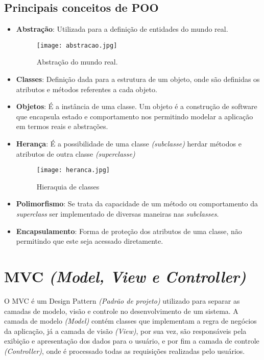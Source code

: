         \subsection{Principais conceitos de POO\label{sub:principais-conceitos}}
            \begin{itemize}
                \item \textbf{Abstração}: Utilizada para a definição de entidades do mundo real.
                        \begin{figure}[!htb]
                            \centering
                            \texttt{[image: abstracao.jpg]}
                            \caption{\small Abstração do mundo real.}
                            \label{cap:conceitos}
                        \end{figure}
                \item \textbf{Classes}: Definição dada para a estrutura de um objeto, onde são definidas os atributos e métodos referentes a cada objeto.
                \item \textbf{Objetos}: É a instância de uma classe. Um objeto é a construção de software que encapsula estado e comportamento nos permitindo modelar a aplicação em termos reais e abstrações.
                \item \textbf{Herança}: É a possibilidade de uma classe \emph{(subclasse)} herdar métodos e atributos de outra classe \emph{(superclasse)}
                        \begin{figure}[!htb]
                            \centering
                            \texttt{[image: heranca.jpg]}
                            \caption{\small Hieraquia de classes}
                            \label{cap:heranca}
                        \end{figure}
                \item \textbf{Polimorfismo}: Se trata da capacidade de um método ou comportamento da \emph{superclass} ser implementado de diversas maneiras nas \emph{subclasses}.
                \item \textbf{Encapsulamento}: Forma de proteção dos atributos de uma classe, não permitindo que este seja acessado diretamente.

            \end{itemize}


    \section{MVC \emph{(Model, View e Controller)} \label{sec:mvc}}
        O MVC é um Design Pattern \emph{(Padrão de projeto)} utilizado para separar as camadas de modelo, visão e controle no desenvolvimento de um sistema. A camada de modelo \emph{(Model)} contém classes que implementam a regra de negócios da aplicação, já a camada de visão \emph{(View)}, por sua vez, são responsáveis pela exibição e apresentação dos dados para o usuário, e por fim a camada de controle \emph{(Controller)}, onde é processado todas as requisições realizadas pelo usuários.

